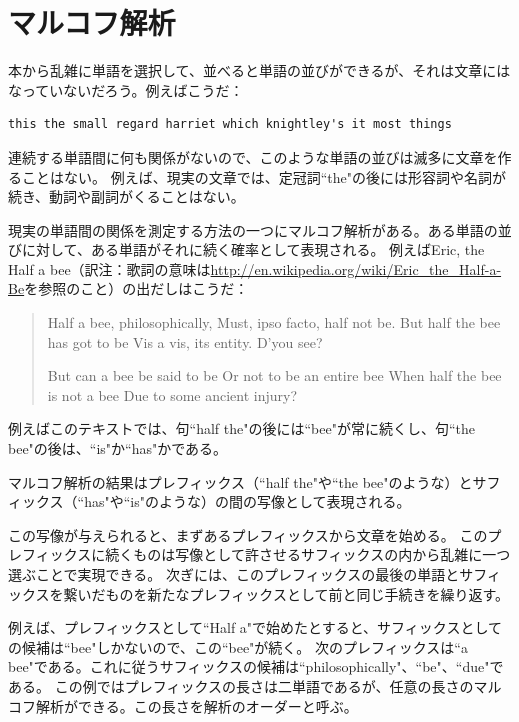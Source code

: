 \documentclass[a4j,12pt,makeidx]{jbook}
\begin{document}
\section{マルコフ解析}
本から乱雑に単語を選択して、並べると単語の並びができるが、それは文章にはなっていないだろう。例えばこうだ：
\begin{verbatim}
this the small regard harriet which knightley's it most things 
\end{verbatim}
連続する単語間に何も関係がないので、このような単語の並びは滅多に文章を作ることはない。
例えば、現実の文章では、定冠詞``the"の後には形容詞や名詞が続き、動詞や副詞がくることはない。\par
現実の単語間の関係を測定する方法の一つにマルコフ解析がある。ある単語の並びに対して、ある単語がそれに続く確率として表現される。
例えばEric, the Half a bee（訳注：歌詞の意味は{\url{http://en.wikipedia.org/wiki/Eric_the_Half-a-Be}}を参照のこと）の出だしはこうだ：
\begin{quote}
Half a bee, philosophically,
Must, ipso facto, half not be.
But half the bee has got to be
Vis a vis, its entity. D'you see?

But can a bee be said to be
Or not to be an entire bee
When half the bee is not a bee
Due to some ancient injury?
\end{quote}
例えばこのテキストでは、句``half the"の後には``bee"が常に続くし、句``the bee"の後は、``is"か``has"かである。\par
マルコフ解析の結果はプレフィックス（``half the"や``the bee"のような）とサフィックス（``has"や``is"のような）の間の写像として表現される。\par
この写像が与えられると、まずあるプレフィックスから文章を始める。
このプレフィックスに続くものは写像として許させるサフィックスの内から乱雑に一つ選ぶことで実現できる。
次ぎには、このプレフィックスの最後の単語とサフィックスを繋いだものを新たなプレフィックスとして前と同じ手続きを繰り返す。\par
例えば、プレフィックスとして``Half a"で始めたとすると、サフィックスとしての候補は``bee"しかないので、この``bee"が続く。
次のプレフィックスは``a bee"である。これに従うサフィックスの候補は``philosophically"、``be"、``due"である。
この例ではプレフィックスの長さは二単語であるが、任意の長さのマルコフ解析ができる。この長さを解析のオーダーと呼ぶ。 \\
\end{document}
